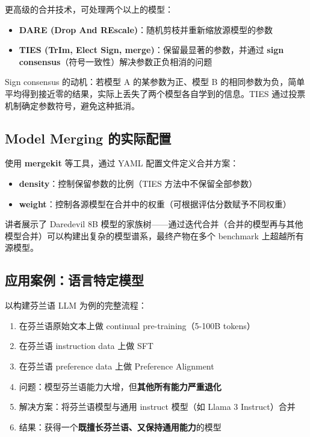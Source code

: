 更高级的合并技术，可处理两个以上的模型：

\begin{itemize}
    \item \textbf{DARE (Drop And REscale)}：随机剪枝并重新缩放源模型的参数
    \item \textbf{TIES (TrIm, Elect Sign, merge)}：保留最显著的参数，并通过 \textbf{sign consensus}（符号一致性）解决参数正负相消的问题
\end{itemize}

Sign consensus 的动机：若模型 A 的某参数为正、模型 B 的相同参数为负，简单平均得到接近零的结果，实际上丢失了两个模型各自学到的信息。TIES 通过投票机制确定参数符号，避免这种抵消。

\subsection{Model Merging 的实际配置}

使用 \textbf{mergekit} 等工具，通过 YAML 配置文件定义合并方案：

\begin{itemize}
    \item \textbf{density}：控制保留参数的比例（TIES 方法中不保留全部参数）
    \item \textbf{weight}：控制各源模型在合并中的权重（可根据评估分数赋予不同权重）
\end{itemize}

讲者展示了 Daredevil 8B 模型的家族树——通过迭代合并（合并的模型再与其他模型合并）可以构建出复杂的模型谱系，最终产物在多个 benchmark 上超越所有源模型。

\subsection{应用案例：语言特定模型}

以构建芬兰语 LLM 为例的完整流程：

\begin{enumerate}
    \item 在芬兰语原始文本上做 continual pre-training（5-100B tokens）
    \item 在芬兰语 instruction data 上做 SFT
    \item 在芬兰语 preference data 上做 Preference Alignment
    \item 问题：模型芬兰语能力大增，但\textbf{其他所有能力严重退化}
    \item 解决方案：将芬兰语模型与通用 instruct 模型（如 Llama 3 Instruct）合并
    \item 结果：获得一个\textbf{既擅长芬兰语、又保持通用能力}的模型
\end{enumerate}

